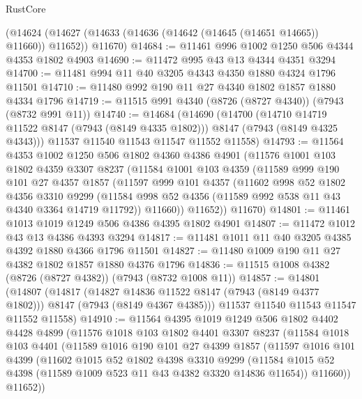\begin{lexlean}{RustCore}
\begin{coremodule}
    (@14624 (@14627 (@14633 (@14636 (@14642 (@14645 (@14651 @14665)) @11660)) @11652)) @11670)
@14684 := @11461 @996 @1002 @1250 @506 @4344 @4353 @1802 @4903
@14690 := @11472 @995 @43 @13 @4344 @4351 @3294
@14700 := @11481 @994 @11 @40 @3205 @4343 @4350 @1880 @4324 @1796 @11501
@14710 := @11480 @992 @190 @11 @27 @4340 @1802 @1857 @1880 @4334 @1796
@14719 := @11515 @991 @4340 (@8726 (@8727 @4340)) (@7943 (@8732 @991 @11))
@14740 := @14684
    (@14690
      (@14700
        (@14710 @14719 @11522 @8147 (@7943 (@8149 @4335 @1802)))
        @8147
        (@7943 (@8149 @4325 @4343)))
      @11537
      @11540
      @11543
      @11547
      @11552
      @11558)
@14793 := @11564
    @4353
    @1002
    @1250
    @506
    @1802
    @4360
    @4386
    @4901
    (@11576
      @1001
      @103
      @1802
      @4359
      @3307
      @8237
      (@11584
        @1001
        @103
        @4359
        (@11589
          @999
          @190
          @101
          @27
          @4357
          @1857
          (@11597
            @999
            @101
            @4357
            (@11602
              @998
              @52
              @1802
              @4356
              @3310
              @9299
              (@11584 @998 @52 @4356 (@11589 @992 @538 @11 @43 @4340 @3364 @14719 @11792))
              @11660))
          @11652))
      @11670)
@14801 := @11461 @1013 @1019 @1249 @506 @4386 @4395 @1802 @4901
@14807 := @11472 @1012 @43 @13 @4386 @4393 @3294
@14817 := @11481 @1011 @11 @40 @3205 @4385 @4392 @1880 @4366 @1796 @11501
@14827 := @11480 @1009 @190 @11 @27 @4382 @1802 @1857 @1880 @4376 @1796
@14836 := @11515 @1008 @4382 (@8726 (@8727 @4382)) (@7943 (@8732 @1008 @11))
@14857 := @14801
    (@14807
      (@14817
        (@14827 @14836 @11522 @8147 (@7943 (@8149 @4377 @1802)))
        @8147
        (@7943 (@8149 @4367 @4385)))
      @11537
      @11540
      @11543
      @11547
      @11552
      @11558)
@14910 := @11564
    @4395
    @1019
    @1249
    @506
    @1802
    @4402
    @4428
    @4899
    (@11576
      @1018
      @103
      @1802
      @4401
      @3307
      @8237
      (@11584
        @1018
        @103
        @4401
        (@11589
          @1016
          @190
          @101
          @27
          @4399
          @1857
          (@11597
            @1016
            @101
            @4399
            (@11602
              @1015
              @52
              @1802
              @4398
              @3310
              @9299
              (@11584 @1015 @52 @4398 (@11589 @1009 @523 @11 @43 @4382 @3320 @14836 @11654))
              @11660))
          @11652))

\end{coremodule}
\end{lexlean}
